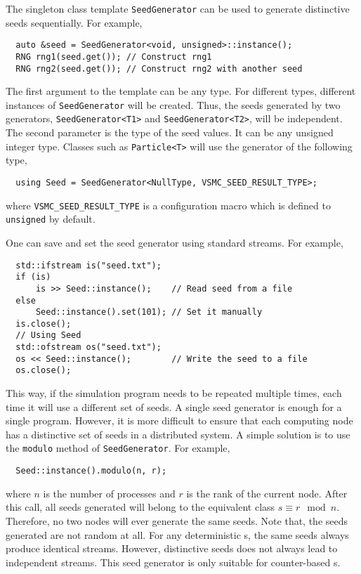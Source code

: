 The singleton class template \verb|SeedGenerator| can be used to generate
distinctive seeds sequentially. For example,
\begin{Verbatim}
  auto &seed = SeedGenerator<void, unsigned>::instance();
  RNG rng1(seed.get()); // Construct rng1
  RNG rng2(seed.get()); // Construct rng2 with another seed
\end{Verbatim}
The first argument to the template can be any type. For different types,
different instances of \verb|SeedGenerator| will be created. Thus, the seeds
generated by two generators, \verb|SeedGenerator<T1>| and
\verb|SeedGenerator<T2>|, will be independent. The second parameter is the type
of the seed values. It can be any unsigned integer type. Classes such as
\verb|Particle<T>| will use the generator of the following type,
\begin{Verbatim}
  using Seed = SeedGenerator<NullType, VSMC_SEED_RESULT_TYPE>;
\end{Verbatim}
where \verb|VSMC_SEED_RESULT_TYPE| is a configuration macro which is defined to
\verb|unsigned| by default.

One can save and set the seed generator using standard \cpp streams. For
example,
\begin{Verbatim}
  std::ifstream is("seed.txt");
  if (is)
      is >> Seed::instance();    // Read seed from a file
  else
      Seed::instance().set(101); // Set it manually
  is.close();
  // Using Seed
  std::ofstream os("seed.txt");
  os << Seed::instance();        // Write the seed to a file
  os.close();
\end{Verbatim}
This way, if the simulation program needs to be repeated multiple times, each
time it will use a different set of seeds. A single seed generator is enough
for a single program. However, it is more difficult to ensure that each
computing node has a distinctive set of seeds in a distributed system. A simple
solution is to use the \verb|modulo| method of \verb|SeedGenerator|. For
example,
\begin{Verbatim}
  Seed::instance().modulo(n, r);
\end{Verbatim}
where $n$ is the number of processes and $r$ is the rank of the current node.
After this call, all seeds generated will belong to the equivalent class $s
\equiv r \mod n$. Therefore, no two nodes will ever generate the same seeds.
Note that, the seeds generated are not random at all. For any deterministic
\rng{}s, the same seeds always produce identical streams. However, distinctive
seeds does not always lead to independent streams. This seed generator is only
suitable for counter-based \rng{}s.

